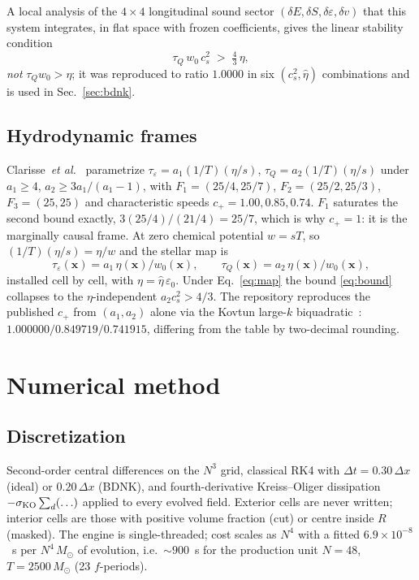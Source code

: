 \documentclass[aps,prd,reprint,amsmath,amssymb,nofootinbib,longbibliography,superscriptaddress]{revtex4-2}
\newcommand{\Msun}{M_\odot}
\newcommand{\cs}{c_s}
\newcommand{\BDNK}{BDNK}
\newcommand{\de}{\delta\varepsilon}
\newcommand{\dS}{\delta S}
\newcommand{\dv}{\delta v}
\newcommand{\KO}{\sigma_{\rm KO}}
\begin{document}
A local analysis of the $4\times4$ longitudinal sound sector $(\delta E,\dS,\de,\dv)$ that this
system integrates, in flat space with frozen coefficients, gives the linear stability condition
\begin{equation}
\tau_Q\,w_0\,\cs^2 \;>\; \tfrac43\,\eta,
\label{eq:bound}
\end{equation}
\emph{not} $\tau_Qw_0 > \eta$; it was reproduced to ratio $1.0000$ in six $(\cs^2,\hat\eta)$
combinations and is used in Sec.~\ref{sec:bdnk}.

\subsection{Hydrodynamic frames}
Clarisse~\emph{et al.}~\cite{Clarisse2025} parametrize $\tau_\varepsilon = a_1(1/T)(\eta/s)$,
$\tau_Q = a_2(1/T)(\eta/s)$ under $a_1\ge4$, $a_2\ge3a_1/(a_1-1)$, with
$F_1 = (25/4,25/7)$, $F_2 = (25/2,25/3)$, $F_3 = (25,25)$ and characteristic speeds
$c_+ = 1.00, 0.85, 0.74$. $F_1$ saturates the second bound exactly, $3(25/4)/(21/4) = 25/7$,
which is why $c_+ = 1$: it is the marginally causal frame. At zero chemical potential
$w = sT$, so $(1/T)(\eta/s) = \eta/w$ and the stellar map is
\begin{equation}
\tau_\varepsilon(\bm x) = a_1\,\eta(\bm x)/w_0(\bm x),\qquad \tau_Q(\bm x) = a_2\,\eta(\bm x)/w_0(\bm x),
\label{eq:map}
\end{equation}
installed cell by cell, with $\eta = \hat\eta\,\varepsilon_0$. Under Eq.~\eqref{eq:map} the bound
\eqref{eq:bound} collapses to the $\eta$-independent $a_2\cs^2 > 4/3$. The repository
reproduces the published $c_+$ from $(a_1,a_2)$ alone via the Kovtun large-$k$
biquadratic~\cite{Kovtun2019}: $1.000000/0.849719/0.741915$, differing from the table by
two-decimal rounding.

\section{Numerical method}
\label{sec:method}

\subsection{Discretization}
Second-order central differences on the $N^3$ grid, classical RK4 with $\Delta t = 0.30\,\Delta x$
(ideal) or $0.20\,\Delta x$ (\BDNK), and fourth-derivative Kreiss--Oliger dissipation
$-\KO\sum_d(\ldots)$ applied to every evolved field. Exterior cells are never written; interior
cells are those with positive volume fraction (cut) or centre inside $R$ (masked). The engine is
single-threaded; cost scales as $N^4$ with a fitted $6.9\times10^{-8}$~s per $N^4\,\Msun$ of
evolution, i.e.\ $\sim900$~s for the production unit $N=48$, $T=2500\,\Msun$ (23 $f$-periods).
\end{document}
